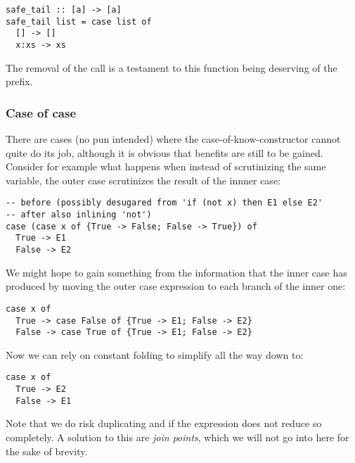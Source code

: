 \begin{listing}[H]
\begin{verbatim}
safe_tail :: [a] -> [a]
safe_tail list = case list of
  [] -> []
  x:xs -> xs
\end{verbatim}
\end{listing}

The removal of the call  is a testament to this function being deserving of the  prefix.

\subsubsection{Case of case}

There are cases (no pun intended) where the case-of-know-constructor cannot quite do its job, although it is obvious
that benefits are still to be gained. Consider for example what happens when instead of scrutinizing the same variable,
the outer case scrutinizes the result of the innner case:


\begin{listing}[H]
\begin{verbatim}
-- before (possibly desugared from 'if (not x) then E1 else E2'
-- after also inlining 'not')
case (case x of {True -> False; False -> True}) of
  True -> E1
  False -> E2
\end{verbatim}
\end{listing}

We might hope to gain something from the information that the inner case has produced by moving the outer case expression
to each branch of the inner one:

\begin{listing}[H]
\begin{verbatim}
case x of
  True -> case False of {True -> E1; False -> E2}
  False -> case True of {True -> E1; False -> E2}
\end{verbatim}
\end{listing}

Now we can rely on constant folding to simplify all the way down to:

\begin{listing}[H]
\begin{verbatim}
case x of
  True -> E2
  False -> E1
\end{verbatim}
\end{listing}

Note that we do risk duplicating  and  if the expression does not reduce so completely.
A solution to this are \textit{join points}, which we will not go into here for the sake of brevity.

